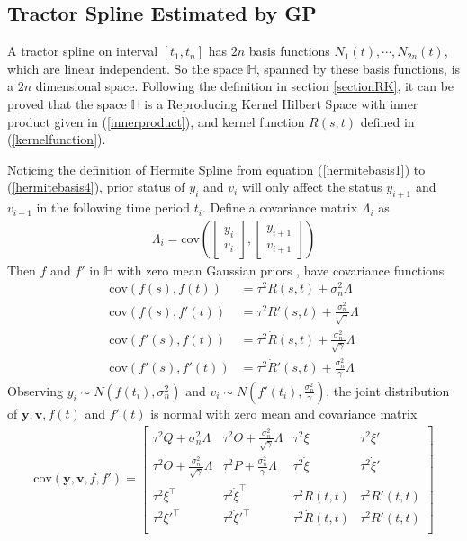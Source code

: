 \subsection{Tractor Spline Estimated by GP}

A tractor spline on interval $[t_1,t_n]$ has $2n$ basis functions $N_1(t), \cdots, N_{2n}(t)$, which are linear independent. So the space $\mathbb{H}$, spanned by these basis functions, is a $2n$ dimensional space. Following the  definition in section \ref{sectionRK}, it can be proved that the space $\mathbb{H}$ is a Reproducing Kernel Hilbert Space with inner product given in (\ref{innerproduct}), and kernel function $R(s,t)$ defined in (\ref{kernelfunction}).

Noticing the definition of Hermite Spline from equation (\ref{hermitebasis1}) to (\ref{hermitebasis4}), prior status of $y_i$ and $v_i$ will only affect the status $y_{i+1}$ and $v_{i+1}$ in the following time period $t_i$. Define a covariance matrix $\Lambda_i$ as 
\begin{align}
\Lambda_i = \text{cov}(\left[  \begin{matrix}y_i\\v_i\end{matrix}\right],\left[ \begin{matrix}y_{i+1}\\v_{i+1} \end{matrix}\right])
\end{align}
Then $f$ and $f'$ in $\mathbb{H}$ with zero mean Gaussian priors , have covariance functions
\begin{equation}
\begin{split}
\text{cov}(f(s),f(t))&=\tau^2 R(s,t)+\sigma_n^2\Lambda\\
\text{cov}(f(s),f'(t))&=\tau^2 R'(s,t)+\frac{\sigma_n^2}{\sqrt{\gamma}}\Lambda\\
\text{cov}(f'(s),f(t))&=\tau^2 \dot{R}(s,t)+\frac{\sigma_n^2}{\sqrt{\gamma}}\Lambda\\
\text{cov}(f'(s),f'(t))&=\tau^2 \dot{R}'(s,t)+\frac{\sigma_n^2}{\gamma}\Lambda
\end{split}
\end{equation}
Observing $y_i \sim N(f(t_i),\sigma_n^2)$ and $v_i \sim N(f'(t_i),\frac{\sigma_n^2}{\gamma})$, the joint distribution of $\mathbf{y}, \mathbf{v}, f(t)$ and $f'(t)$ is normal with zero mean and covariance matrix
\begin{equation}
\begin{split}
\text{cov}(\mathbf{y},\mathbf{v},f,f') =
\left[ \begin{matrix}
\tau^2Q+\sigma_n^2\Lambda & \tau^2 O+\frac{\sigma_n^2}{\sqrt{\gamma}}\Lambda & \tau^2\xi & \tau^2\xi' \\
\tau^2 O+\frac{\sigma_n^2}{\sqrt{\gamma}}\Lambda & \tau^2 P+\frac{\sigma_n^2}{\gamma}\Lambda & \tau^2 \dot{\xi}& \tau^2\dot{\xi}' \\
\tau^2\xi^\top & \tau^2\dot{\xi}^\top & \tau^2R(t,t)& \tau^2R'(t,t) \\
 \tau^2\xi'^\top& \tau^2\dot{\xi}'^\top& \tau^2\dot{R}(t,t)& \tau^2\dot{R}'(t,t)  \\
\end{matrix} \right]
\end{split}
\end{equation}
